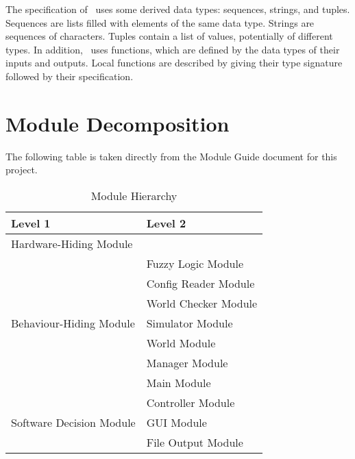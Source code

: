 \documentclass[12pt, titlepage]{article}
\begin{document}
\noindent
The specification of \progname \ uses some derived data types: sequences, strings, and
tuples. Sequences are lists filled with elements of the same data type. Strings
are sequences of characters. Tuples contain a list of values, potentially of
different types. In addition, \progname \ uses functions, which
are defined by the data types of their inputs and outputs. Local functions are
described by giving their type signature followed by their specification.

\section{Module Decomposition}

The following table is taken directly from the Module Guide document for this project.

\begin{table}[h!]
\centering
\begin{tabular}{p{} p{}}
\toprule
\textbf{Level 1} & \textbf{Level 2}\\
\midrule

{Hardware-Hiding Module} & ~ \\
\midrule

\multirow{7}{0.3\textwidth}{Behaviour-Hiding Module}
& Fuzzy Logic Module\\
& Config Reader Module\\
& World Checker Module\\
& Simulator Module\\
& World Module\\
& Manager Module\\
& Main Module\\
\midrule

\multirow{3}{0.3\textwidth}{Software Decision Module}
& Controller Module\\
& GUI Module\\
& File Output Module\\
\bottomrule

\end{tabular}
\caption{Module Hierarchy}
\label{TblMH}
\end{table}

\newpage
~\newpage
\end{document}
